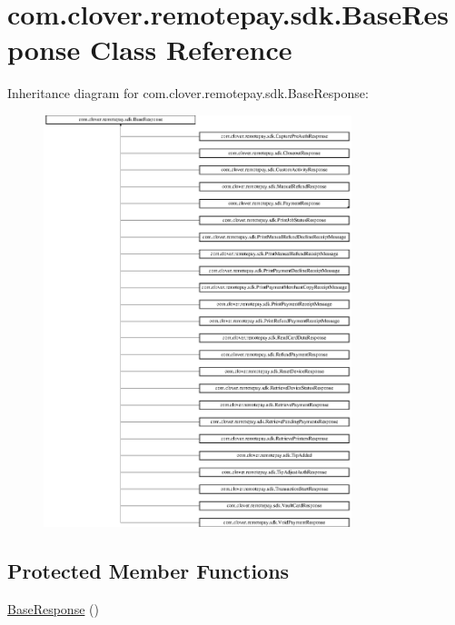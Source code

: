 \hypertarget{classcom_1_1clover_1_1remotepay_1_1sdk_1_1_base_response}{}\section{com.\+clover.\+remotepay.\+sdk.\+Base\+Response Class Reference}
\label{classcom_1_1clover_1_1remotepay_1_1sdk_1_1_base_response}


 


Inheritance diagram for com.\+clover.\+remotepay.\+sdk.\+Base\+Response\+:\begin{figure}[H]
\begin{center}
\leavevmode
\includegraphics[height=12.000000cm]{classcom_1_1clover_1_1remotepay_1_1sdk_1_1_base_response}
\end{center}
\end{figure}
\subsection*{Protected Member Functions}
\begin{DoxyCompactItemize}
\item 
\hyperlink{classcom_1_1clover_1_1remotepay_1_1sdk_1_1_base_response_a0e61c35912e08727838552345d6a8c86}{Base\+Response} ()
\end{DoxyCompactItemize}
